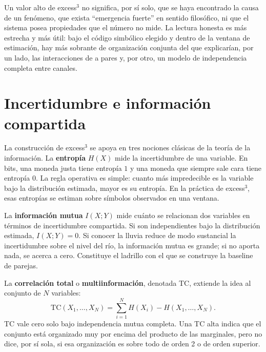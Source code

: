 \documentclass[11pt,a4paper]{article}
\begin{document}
\begin{atencion}
Un valor alto de excess$^3$ no significa, por s\'i solo, que se haya
encontrado la causa de un fen\'omeno, que exista ``emergencia fuerte'' en
sentido filos\'ofico, ni que el sistema posea propiedades que el n\'umero no
mide. La lectura honesta es m\'as estrecha y m\'as \'util: bajo el c\'odigo
simb\'olico elegido y dentro de la ventana de estimaci\'on, hay m\'as sobrante
de organizaci\'on conjunta del que explicar\'ian, por un lado, las
interacciones de a pares y, por otro, un modelo de independencia completa
entre canales.
\end{atencion}

\section{Incertidumbre e informaci\'on compartida}
\label{sec:entropia}

La construcci\'on de excess$^3$ se apoya en tres nociones cl\'asicas de la
teor\'ia de la informaci\'on. La \textbf{entrop\'ia} $H(X)$ mide la
incertidumbre de una variable. En bits, una moneda justa tiene entrop\'ia $1$
y una moneda que siempre sale cara tiene entrop\'ia $0$. La regla operativa
es simple: cuanto m\'as impredecible es la variable bajo la distribuci\'on
estimada, mayor es su entrop\'ia. En la pr\'actica de excess$^3$, esas
entrop\'ias se estiman sobre s\'imbolos observados en una ventana.

La \textbf{informaci\'on mutua} $I(X;Y)$ mide cu\'anto se relacionan dos
variables en t\'erminos de incertidumbre compartida. Si son independientes
bajo la distribuci\'on estimada, $I(X;Y)=0$. Si conocer la lluvia reduce de
modo sustancial la incertidumbre sobre el nivel del r\'io, la informaci\'on
mutua es grande; si no aporta nada, se acerca a cero. Constituye el ladrillo
con el que se construye la baseline de parejas.

La \textbf{correlaci\'on total} o \textbf{multiinformaci\'on}, denotada TC,
extiende la idea al conjunto de $N$ variables:
\begin{equation}
\mathrm{TC}(X_1,\ldots,X_N)
=
\sum_{i=1}^{N}H(X_i)-H(X_1,\ldots,X_N).
\end{equation}
TC vale cero solo bajo independencia mutua completa. Una TC alta indica que
el conjunto est\'a organizado muy por encima del producto de las marginales,
pero no dice, por s\'i sola, si esa organizaci\'on es sobre todo de orden 2
o de orden superior.
\end{document}
